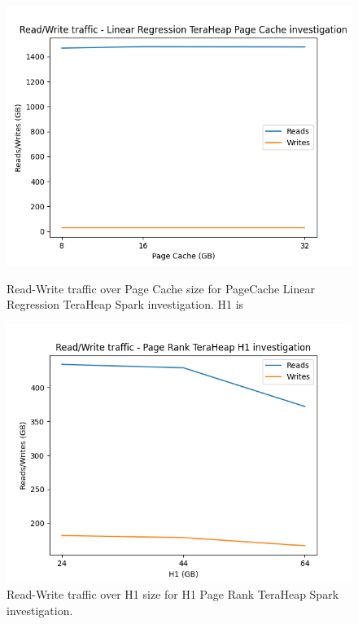 \begin{figure}[thbp]
    \includegraphics[width=\linewidth]{./fig/rw_linr_pc_th.png}
    \caption{Read-Write traffic over Page Cache size for PageCache Linear
    Regression TeraHeap Spark investigation. H1 is }
    \label{fig:rw_linr_pc_th}

    \includegraphics[width=\linewidth]{./fig/rw_pr_h1_th.png}
    \caption{Read-Write traffic over H1 size for H1 Page Rank TeraHeap
    Spark investigation.}
    \label{fig:rw_pr_h1_th}
\end{figure}
\fi

\iffalse
